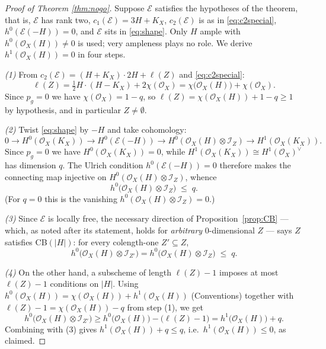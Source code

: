 \documentclass[10pt,a4paper]{amsart}
\newcommand{\OO}{\mathcal{O}}
\newcommand{\EE}{\mathcal{E}}
\newcommand{\II}{\mathcal{I}}
\newcommand{\len}{\ell}
\begin{document}
\begin{proof}[Proof of Theorem \textup{\ref{thm:nogo}}]
Suppose $\EE$ satisfies the hypotheses of the theorem, that is, $\EE$ has rank two, $c_1(\EE)=3H+K_X$, $c_2(\EE)$ is as in \eqref{eq:c2special}, $h^0(\EE(-H))=0$, and $\EE$ sits in \eqref{eq:shape}. Only $H$ ample with $h^0(\OO_X(H))\neq0$ is used; very ampleness plays no role. We derive $h^1(\OO_X(H))=0$ in four steps.

\emph{(1)} From $c_2(\EE)=(H+K_X)\cdot 2H+\len(Z)$ and \eqref{eq:c2special}:
\[
\len(Z)=\tfrac12H\cdot(H-K_X)+2\chi(\OO_X)=\chi\bigl(\OO_X(H)\bigr)+\chi(\OO_X) .
\]
Since $p_g=0$ we have $\chi(\OO_X)=1-q$, so $\len(Z)=\chi(\OO_X(H))+1-q\ge1$ by hypothesis, and in particular $Z\neq\emptyset$.

\emph{(2)} Twist \eqref{eq:shape} by $-H$ and take cohomology:
\[
0\to H^0(\OO_X(K_X))\to H^0(\EE(-H))\to H^0(\OO_X(H)\otimes\II_Z)\to H^1(\OO_X(K_X)).
\]
Since $p_g=0$ we have $H^0(\OO_X(K_X))=0$, while $H^1(\OO_X(K_X))\cong H^1(\OO_X)^\vee$ has dimension $q$. The Ulrich condition $h^0(\EE(-H))=0$ therefore makes the connecting map injective on $H^0(\OO_X(H)\otimes\II_Z)$, whence
\[
h^0\bigl(\OO_X(H)\otimes\II_Z\bigr)\;\le\;q .
\]
(For $q=0$ this is the vanishing $h^0(\OO_X(H)\otimes\II_Z)=0$.)

\emph{(3)} Since $\EE$ is locally free, the necessary direction of Proposition~\ref{prop:CB} --- which, as noted after its statement, holds for \emph{arbitrary} $0$-dimensional $Z$ --- says $Z$ satisfies CB$(|H|)$: for every colength-one $Z'\subseteq Z$,
\[
h^0\bigl(\OO_X(H)\otimes\II_{Z'}\bigr)=h^0\bigl(\OO_X(H)\otimes\II_{Z}\bigr)\;\le\;q .
\]

\emph{(4)} On the other hand, a subscheme of length $\len(Z)-1$ imposes at most $\len(Z)-1$ conditions on $|H|$. Using $h^0(\OO_X(H))=\chi(\OO_X(H))+h^1(\OO_X(H))$ (Conventions) together with $\len(Z)-1=\chi(\OO_X(H))-q$ from step (1), we get
\[
h^0\bigl(\OO_X(H)\otimes\II_{Z'}\bigr)\ge h^0\bigl(\OO_X(H)\bigr)-\bigl(\len(Z)-1\bigr)=h^1\bigl(\OO_X(H)\bigr)+q .
\]
Combining with (3) gives $h^1(\OO_X(H))+q\le q$, i.e.\ $h^1(\OO_X(H))\le0$, as claimed.
\end{proof}
\end{document}
